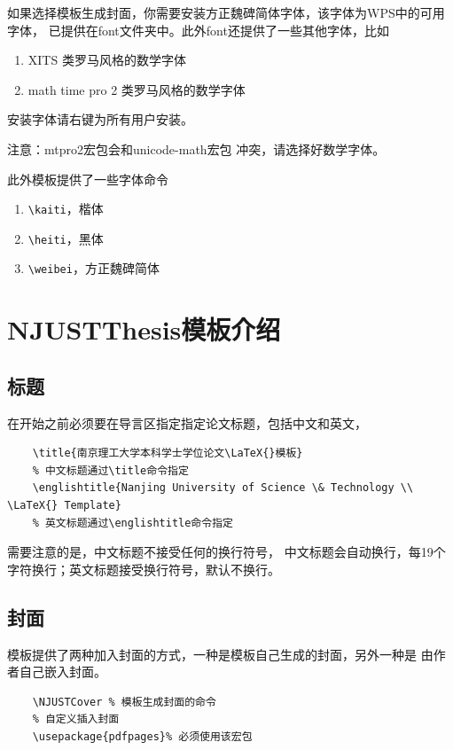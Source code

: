如果选择模板生成封面，你需要安装{\ttfamily 方正魏碑简体}字体，该字体为WPS中的可用字体，
已提供在{\ttfamily font}文件夹中。此外{\ttfamily font}还提供了一些其他字体，比如
\begin{enumerate}
    \item {\ttfamily XITS} 类罗马风格的数学字体
    \item {\ttfamily math time pro 2} 类罗马风格的数学字体
\end{enumerate}
安装字体请右键为所有用户安装。

{\color{red} \heiti 注意：{\ttfamily mtpro2}宏包会和{\ttfamily unicode-math}宏包
冲突，请选择好数学字体}。

此外模板提供了一些字体命令
\begin{enumerate}
    \item \lstinline|\kaiti|，{\kaiti 楷体}
    \item \lstinline|\heiti|，{\heiti 黑体}
    \item \lstinline|\weibei|，{\weibei 方正魏碑简体}
\end{enumerate}

\section{NJUSTThesis模板介绍}
\subsection{标题}
在开始之前必须要在导言区指定指定论文标题，包括中文和英文，
\begin{lstlisting}
    \title{南京理工大学本科学士学位论文\LaTeX{}模板}
    % 中文标题通过\title命令指定
    \englishtitle{Nanjing University of Science \& Technology \\ \LaTeX{} Template}
    % 英文标题通过\englishtitle命令指定
\end{lstlisting}
需要注意的是，中文标题不接受任何的换行符号，
中文标题会自动换行，每19个字符换行；英文标题接受换行符号，默认不换行。

\subsection{封面}
模板提供了两种加入封面的方式，一种是模板自己生成的封面，另外一种是
由作者自己嵌入封面。
\begin{lstlisting}
    \NJUSTCover % 模板生成封面的命令
    % 自定义插入封面
    \usepackage{pdfpages}% 必须使用该宏包
    
\end{lstlisting}

